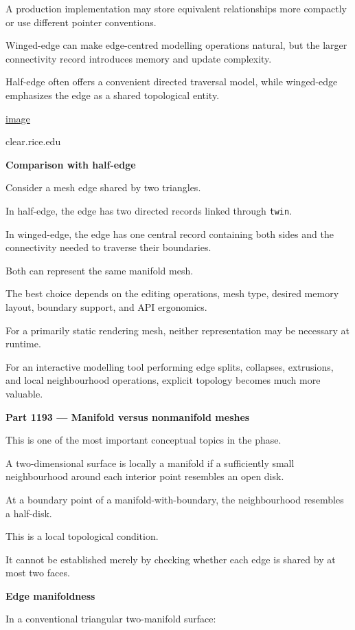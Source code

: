 A production implementation may store equivalent relationships more compactly or use different pointer conventions.

Winged-edge can make edge-centred modelling operations natural, but the larger connectivity record introduces memory and update complexity.

Half-edge often offers a convenient directed traversal model, while winged-edge emphasizes the edge as a shared topological entity. 

\href{https://www.google.com/s2/favicons?domain=https://www.clear.rice.edu&sz=32}{image}

clear.rice.edu

\textbf{Comparison with half-edge}

Consider a mesh edge shared by two triangles.

In half-edge, the edge has two directed records linked through \texttt{twin}.

In winged-edge, the edge has one central record containing both sides and the connectivity needed to traverse their boundaries.

Both can represent the same manifold mesh.

The best choice depends on the editing operations, mesh type, desired memory layout, boundary support, and API ergonomics.

For a primarily static rendering mesh, neither representation may be necessary at runtime.

For an interactive modelling tool performing edge splits, collapses, extrusions, and local neighbourhood operations, explicit topology becomes much more valuable.

\textbf{Part 1193 --- Manifold versus nonmanifold meshes}

This is one of the most important conceptual topics in the phase.

A two-dimensional surface is locally a manifold if a sufficiently small neighbourhood around each interior point resembles an open disk.

At a boundary point of a manifold-with-boundary, the neighbourhood resembles a half-disk.

This is a local topological condition.

It cannot be established merely by checking whether each edge is shared by at most two faces.

\textbf{Edge manifoldness}

In a conventional triangular two-manifold surface:

